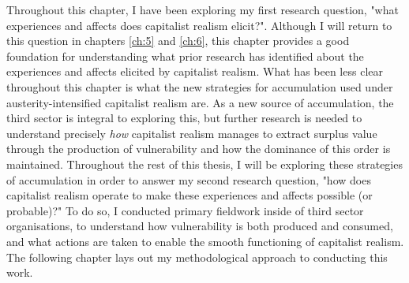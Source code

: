 Throughout this chapter, I have been exploring my first research question, "what experiences and affects does capitalist realism elicit?". Although I will return to this question in chapters \ref{ch:5} and \ref{ch:6}, this chapter provides a good foundation for understanding what prior research has identified about the experiences and affects elicited by capitalist realism. What has been less clear throughout this chapter is what the new strategies for accumulation used under austerity-intensified capitalist realism are. As a new source of accumulation, the third sector is integral to exploring this, but further research is needed to understand precisely \emph{how} capitalist realism manages to extract surplus value through the production of vulnerability and how the dominance of this order is maintained. Throughout the rest of this thesis, I will be exploring these strategies of accumulation in order to answer my second research question, "how does capitalist realism operate to make these experiences and affects possible (or probable)?" To do so, I conducted primary fieldwork inside of third sector organisations, to understand how vulnerability is both produced and consumed, and what actions are taken to enable the smooth functioning of capitalist realism. The following chapter lays out my methodological approach to conducting this work.